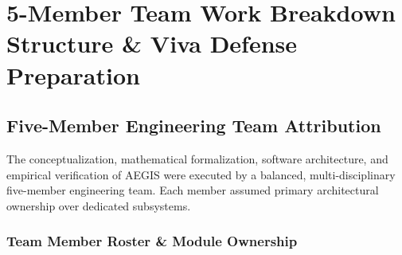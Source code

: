 \chapter{5-Member Team Work Breakdown Structure \& Viva Defense Preparation}
\label{chap:wbs}

\section{Five-Member Engineering Team Attribution}
The conceptualization, mathematical formalization, software architecture, and empirical verification of AEGIS were executed by a balanced, multi-disciplinary five-member engineering team. Each member assumed primary architectural ownership over dedicated subsystems.

\subsection{Team Member Roster \& Module Ownership}
